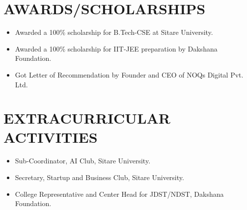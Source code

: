 \documentclass[a4paper,10pt]{article}
\begin{document}
\section*{AWARDS/SCHOLARSHIPS}
\begin{itemize}[leftmargin=4em]
\item Awarded a 100\% scholarship for B.Tech-CSE at Sitare University.
\item Awarded a 100\% scholarship for IIT-JEE preparation by Dakshana Foundation.
\item Got Letter of Recommendation by Founder and CEO of NOQs Digital Pvt. Ltd.
\end{itemize}


\section*{EXTRACURRICULAR ACTIVITIES}
\begin{itemize}[leftmargin=4em]
\item Sub-Coordinator, AI Club, Sitare University.
\item Secretary, Startup and Business Club, Sitare University.
\item College Representative and Center Head for JDST/NDST, Dakshana Foundation.
\end{itemize}
\end{document}
